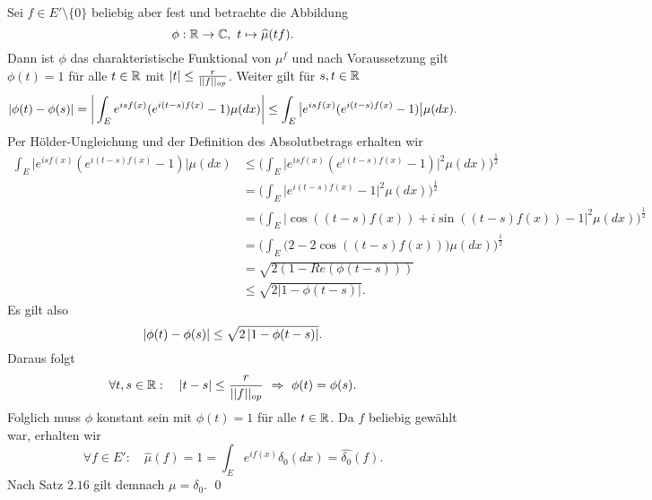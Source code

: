 \begin{proof*}
    Sei $f \in E'\setminus\{0\}$ beliebig aber fest und betrachte die Abbildung 
    $$
        \phi : \mathbb{R} \to \mathbb{C}, \ t \mapsto \widehat{\mu}(tf). 
    $$
    Dann ist $\phi$ das charakteristische Funktional von $\mu^{f}$ und nach Voraussetzung gilt $\phi(t) = 1$ für alle $t \in \mathbb{R}$ mit $\left| t \right| \leq \frac{r}{\lvert\lvert f \rvert\rvert_{op}}$. 
    Weiter gilt für $s,t \in \mathbb{R}$
    \begin{align*}
        \left| \phi(t) - \phi(s) \right| = \bigg\lvert\int_E e^{isf(x)}(e^{i(t-s)f(x)} - 1)\mu(dx)\bigg\rvert \leq \int_E\big\lvert e^{isf(x)}(e^{i(t-s)f(x)} - 1)\big\rvert\mu(dx).
    \end{align*}
    Per Hölder-Ungleichung und der Definition des Absolutbetrags erhalten wir 
    \begin{align*}
        \int_E\big\lvert e^{isf(x)}(e^{i(t-s)f(x)} - 1)\big\rvert\mu(dx) &\leq \bigg(\int_E\big\lvert e^{isf(x)}(e^{i(t-s)f(x)} - 1)\big\rvert^2\mu(dx)\bigg)^{\frac{1}{2}} \\\
                                                          &= \bigg( \int_E \big\lvert e^{i(t-s)f(x)}-1\big\rvert^2\mu(dx) \bigg)^{\frac{1}{2}} \\\
                                                          &= \bigg( \int_E \big\lvert \cos((t-s)f(x)) + i \sin((t-s)f(x)) -1 \big\rvert^2\mu(dx) \bigg)^{\frac{1}{2}} \\\
                                                          &= \bigg( \int_E \big( 2 - 2\cos((t-s)f(x)) \big)\mu(dx) \bigg)^{\frac{1}{2}} \\\
                                                          &= \sqrt{2(1- Re(\phi(t-s)))} \\\
                                                          &\leq \sqrt{2\lvert 1 - \phi(t-s)\rvert}. 
    \end{align*}                        
    Es gilt also
    $$
        \left| \phi(t) - \phi(s) \right| \leq \sqrt{2\left| 1-\phi(t-s) \right|}.
    $$
    Daraus folgt
    $$
        \forall t,s \in \mathbb{R}: \quad \left| t-s \right| \leq \frac{r}{\lvert\lvert f \rvert\rvert_{op}} \ \Rightarrow \ \phi(t) = \phi(s). 
    $$
    Folglich muss $\phi$ konstant sein mit $\phi(t) = 1$ für alle $t \in \mathbb{R}$. Da $f$ beliebig gewählt war, erhalten wir
    $$
        \forall f \in E': \quad \widehat{\mu}(f) = 1 = \int_E e^{if(x)}\delta_0(dx) = \widehat{\delta_0}(f). 
    $$
    Nach Satz $2.16$ gilt demnach $\mu = \delta_0$. \qed
\end{proof*}

